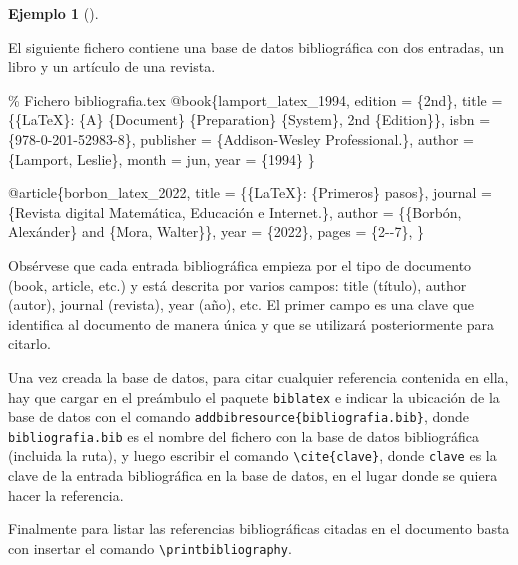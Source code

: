 \documentclass[
  a4paper,
]{scrreport}
\newenvironment{Shaded}{\begin{snugshade}}{\end{snugshade}}
\newcommand{\CommentTok}[1]{\textcolor[rgb]{0.37,0.37,0.37}{#1}}
\newcommand{\NormalTok}[1]{\textcolor[rgb]{0.00,0.23,0.31}{#1}}
\theoremstyle{definition}
\newtheorem{example}{Ejemplo}[chapter]
\theoremstyle{remark}
\begin{document}
\begin{example}[]\protect\hypertarget{exm-bibliografia}{}\label{exm-bibliografia}

El siguiente fichero contiene una base de datos bibliográfica con dos
entradas, un libro y un artículo de una revista.

\begin{Shaded}
\begin{Highlighting}[]
\CommentTok{\% Fichero bibliografia.tex}
\NormalTok{@book\{lamport\_latex\_1994,}
\NormalTok{    edition = \{2nd\},}
\NormalTok{    title = \{\{LaTeX\}: \{A\} \{Document\} \{Preparation\} \{System\}, 2nd \{Edition\}\},}
\NormalTok{    isbn = \{978{-}0{-}201{-}52983{-}8\},}
\NormalTok{    publisher = \{Addison{-}Wesley Professional.\},}
\NormalTok{    author = \{Lamport, Leslie\},}
\NormalTok{    month = jun,}
\NormalTok{    year = \{1994\}}
\NormalTok{\}}

\NormalTok{@article\{borbon\_latex\_2022,}
\NormalTok{    title = \{\{LaTeX\}: \{Primeros\} pasos\},}
\NormalTok{    journal = \{Revista digital Matemática, Educación e Internet.\},}
\NormalTok{    author = \{\{Borbón, Alexánder\} and \{Mora, Walter\}\},}
\NormalTok{    year = \{2022\},}
\NormalTok{    pages = \{2{-}{-}7\},}
\NormalTok{\}}
\end{Highlighting}
\end{Shaded}

\end{example}

Obsérvese que cada entrada bibliográfica empieza por el tipo de
documento (book, article, etc.) y está descrita por varios campos: title
(título), author (autor), journal (revista), year (año), etc. El primer
campo es una clave que identifica al documento de manera única y que se
utilizará posteriormente para citarlo.

Una vez creada la base de datos, para citar cualquier referencia
contenida en ella, hay que cargar en el preámbulo el paquete
\texttt{biblatex} e indicar la ubicación de la base de datos con el
comando \texttt{addbibresource\{bibliografia.bib\}}, donde
\texttt{bibliografia.bib} es el nombre del fichero con la base de datos
bibliográfica (incluida la ruta), y luego escribir el comando
\texttt{\textbackslash{}cite\{clave\}}, donde \texttt{clave} es la clave
de la entrada bibliográfica en la base de datos, en el lugar donde se
quiera hacer la referencia.

Finalmente para listar las referencias bibliográficas citadas en el
documento basta con insertar el comando
\texttt{\textbackslash{}printbibliography}.
\end{document}
